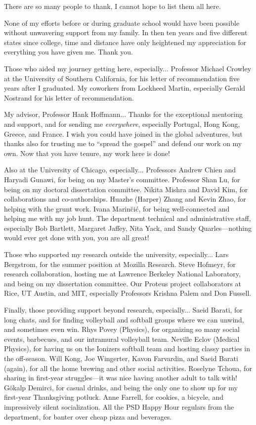 There are so many people to thank, I cannot hope to list them all here.

None of my efforts before or during graduate school would have been possible without unwavering support from my family.
In then ten years and five different states since college, time and distance have only heightened my appreciation for everything you have given me.
Thank you.

Those who aided my journey getting here, especially...
Professor Michael Crowley at the University of Southern California, for his letter of recommendation five years after I graduated.
My coworkers from Lockheed Martin, especially Gerald Nostrand for his letter of recommendation. %

My advisor, Professor Hank Hoffmann...
Thanks for the exceptional mentoring and support, and for sending me \emph{everywhere}, especially Portugal, Hong Kong, Greece, and France.
I wish you could have joined in the global adventures, but thanks also for trusting me to ``spread the gospel'' and defend our work on my own.
Now that you have tenure, my work here is done!

Also at the University of Chicago, especially...
Professors Andrew Chien and Haryadi Gunawi, for being on my Master's committee.
Professor Shan Lu, for being on my doctoral dissertation committee.
Nikita Mishra and David Kim, for collaborations and co-authorships.
Huazhe (Harper) Zhang and Kevin Zhao, for helping with the grunt work.
Ivana Marin{\u c}i{\'c}, for being well-connected and helping me with my job hunt.
The department technical and administrative staff, especially Bob Bartlett, Margaret Jaffey, Nita Yack, and Sandy Quarles---nothing would ever get done with you, you are all great!

Those who supported my research outside the university, especially...
Lars Bergstrom, for the summer position at Mozilla Research.
Steve Hofmeyr, for research collaboration, hosting me at Lawrence Berkeley National Laboratory, and being on my dissertation committee.
Our Proteus project collaborators at Rice, UT Austin, and MIT, especially Professors Krishna Palem and Don Fussell.

Finally, those providing support beyond research, especially...
Saeid Barati, for long chats, and for finding volleyball and softball groups where we can unwind, and sometimes even win.
Rhys Povey (Physics), for organizing so many social events, barbecues, and our intramural volleyball team.
Neville Eclov (Medical Physics), for having us on the Ionizers softball team and hosting classy parties in the off-season.
Will Kong, Joe Wingerter, Kavon Farvardin, and Saeid Barati (again), for all the home brewing and other social activities.
Roselyne Tchoua, for sharing in first-year struggles---it was nice having another adult to talk with!
G{\"o}kalp Demirci, for casual drinks, and being the only one to show up for my first-year Thanksgiving potluck.
Anne Farrell, for cookies, a bicycle, and impressively silent socialization.
All the PSD Happy Hour regulars from the department, for banter over cheap pizza and beverages.

